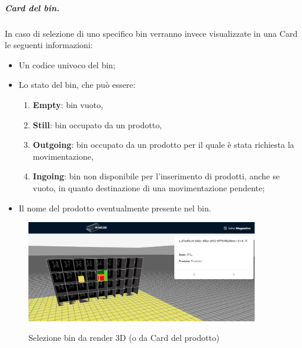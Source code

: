                 \subparagraph{Card del bin.}
                In caso di selezione di uno specifico bin verranno invece visualizzate in una Card le seguenti informazioni:
                \begin{itemize}
                    \item Un codice univoco del bin;
                    \item Lo stato del bin, che può essere: 
                    \begin{enumerate}
                        \item \textbf{Empty}: bin vuoto,
                        \item \textbf{Still}: bin occupato da un prodotto,
                        \item \textbf{Outgoing}: bin occupato da un prodotto per il quale è stata richiesta la movimentazione,
                        \item \textbf{Ingoing}: bin non disponibile per l'inserimento di prodotti, anche se vuoto, in quanto destinazione di una movimentazione pendente;
                    \end{enumerate}
                    \item Il nome del prodotto eventualmente presente nel bin.
                \end{itemize}
                \begin{figure}[h!]
                    \centering
                    \includegraphics[width=0.9\textwidth]{images/selezione_bin.png}
                    \label{sel_bin}
                    \caption{Selezione bin da render 3D (o da Card del prodotto)}
                \end{figure}

